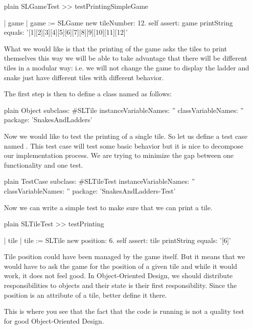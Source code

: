 \documentclass[10pt,twoside,english]{_support/latex/sbabook/sbabook}
\begin{document}
\begin{displaycode}{plain}
SLGameTest >> testPrintingSimpleGame

	| game |
	game := SLGame new tileNumber: 12.
	self 
		assert: game printString 
		equals: '[1][2][3][4][5][6][7][8][9][10][11][12]'
\end{displaycode}

What we would like is that the printing of the game asks the tiles to print themselves this way we will be able to take advantage that there will be different tiles in a modular way: i.e. we will not change the game to display the ladder and snake just have different tiles with different behavior. 

The first step is then to define a class named  as follows:

\begin{displaycode}{plain}
Object subclass: #SLTile
	instanceVariableNames: ''
	classVariableNames: ''
	package: 'SnakesAndLadders'
\end{displaycode}

Now we would like to test the printing of a single tile. So let us define a test case named . This test case will test some basic behavior but it is nice to decompose our
implementation process. We are trying to minimize the gap between one functionality and one test.

\begin{displaycode}{plain}
TestCase subclass: #SLTileTest
	instanceVariableNames: ''
	classVariableNames: ''
	package: 'SnakesAndLadders-Test'
\end{displaycode}

Now we can write a simple test to make sure that we can print a tile.

\begin{displaycode}{plain}
SLTileTest >> testPrinting

	| tile |
	tile := SLTile new position: 6.
	self assert: tile printString equals: '[6]'
\end{displaycode}

Tile position could have been managed by the game itself.  But it means that we would have to ask the game for the position of a given tile and while it would work, it does not feel good.
In Object-Oriented Design, we should distribute responsibilities to objects and their state is their first responsibility. Since the position is an attribute of a tile, better define it there.

This is where you see that the fact that the code is running is not a quality test for good Object-Oriented Design.
\end{document}
